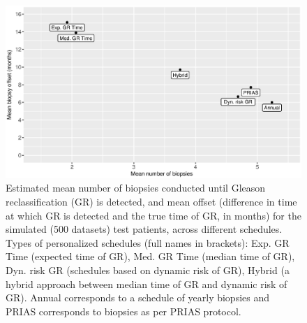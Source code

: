     \clearpage
    \begin{figure}
    \centerline{\includegraphics[width=\columnwidth]{../images/sim_study/meanNbVsOffset_all.eps}}
    \caption{Estimated mean number of biopsies conducted until Gleason reclassification (GR) is detected, and mean offset (difference in time at which GR is detected and the true time of GR, in months) for the simulated (500 datasets) test patients, across different schedules. Types of personalized schedules (full names in brackets): Exp. GR Time (expected time of GR), Med. GR Time (median time of GR), Dyn. risk GR (schedules based on dynamic risk of GR), Hybrid (a hybrid approach between median time of GR and dynamic risk of GR). Annual corresponds to a schedule of yearly biopsies and PRIAS corresponds to biopsies as per PRIAS protocol.}
    \label{fig : meanNbVsOffset}
    \end{figure}

